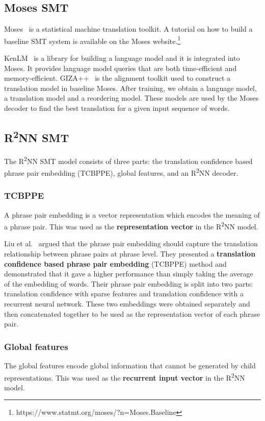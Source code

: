 \documentclass[12pt,a4paper,twoside]{report}
\begin{document}
\subsection{Moses SMT}
Moses~\cite{moses} is a statistical machine translation toolkit. A tutorial on how to build a baseline SMT system is available on the Moses website.\footnote{https://www.statmt.org/moses/?n=Moses.Baseline}

KenLM~\cite{heafield-2011-kenlm} is a library for building a language model and it is integrated into Moses. It provides language model queries that are both time-efficient and memory-efficient. GIZA++~\cite{giza_pp} is the alignment toolkit used to construct a translation model in baseline Moses. After training, we obtain a language model, a translation model and a reordering model. These models are used by the Moses decoder to find the best translation for a given input sequence of words.

\subsection{\texorpdfstring{R\textsuperscript{2}NN}{R2NN} SMT}
The R\textsuperscript{2}NN SMT model consists of three parts: the translation confidence based phrase pair embedding (TCBPPE), global features, and an R\textsuperscript{2}NN decoder.

\subsubsection{TCBPPE}
A phrase pair embedding is a vector representation which encodes the meaning of a phrase pair. This was used as the \textbf{representation vector} in the R\textsuperscript{2}NN model.

Liu et al.~\cite{r2nn} argued that the phrase pair embedding should capture the translation relationship between phrase pairs at phrase level. They presented a \textbf{translation confidence based phrase pair embedding} (TCBPPE) method and demonstrated that it gave a higher performance than simply taking the average of the embedding of words. Their phrase pair embedding is split into two parts: translation confidence with sparse features and translation confidence with a recurrent neural network. These two embeddings were obtained separately and then concatenated together to be used as the representation vector of each phrase pair.

\subsubsection{Global features}
The global features encode global information that cannot be generated by child representations. This was used as the \textbf{recurrent input vector} in the R\textsuperscript{2}NN model.
\end{document}
